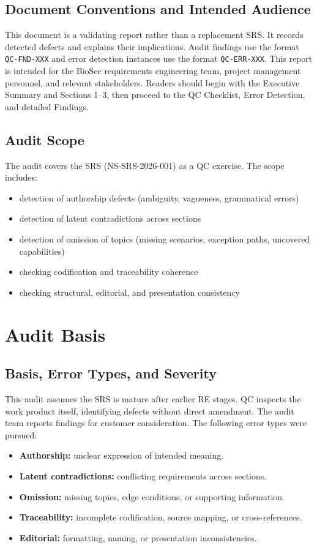 \documentclass[11pt,a4paper]{article}
\begin{document}
\subsection{Document Conventions and Intended Audience}
This document is a validating report rather than a replacement SRS. It records detected defects and explains their implications. Audit findings use the format \texttt{QC-FND-XXX} and error detection instances use the format \texttt{QC-ERR-XXX}. This report is intended for the BioSec requirements engineering team, project management personnel, and relevant stakeholders. Readers should begin with the Executive Summary and Sections 1--3, then proceed to the QC Checklist, Error Detection, and detailed Findings.

\subsection{Audit Scope}
The audit covers the SRS (NS-SRS-2026-001) as a QC exercise. The scope includes:
\begin{itemize}[leftmargin=*, nosep]
\item detection of authorship defects (ambiguity, vagueness, grammatical errors)
\item detection of latent contradictions across sections
\item detection of omission of topics (missing scenarios, exception paths, uncovered capabilities)
\item checking codification and traceability coherence
\item checking structural, editorial, and presentation consistency
\end{itemize}

\section{Audit Basis}

\subsection{Basis, Error Types, and Severity}
This audit assumes the SRS is mature after earlier RE stages. QC inspects the work product itself, identifying defects without direct amendment. The audit team reports findings for customer consideration. The following error types were pursued:

\begin{itemize}[leftmargin=*, nosep]
\item \textbf{Authorship:} unclear expression of intended meaning.
\item \textbf{Latent contradictions:} conflicting requirements across sections.
\item \textbf{Omission:} missing topics, edge conditions, or supporting information.
\item \textbf{Traceability:} incomplete codification, source mapping, or cross-references.
\item \textbf{Editorial:} formatting, naming, or presentation inconsistencies.
\end{itemize}
\end{document}
